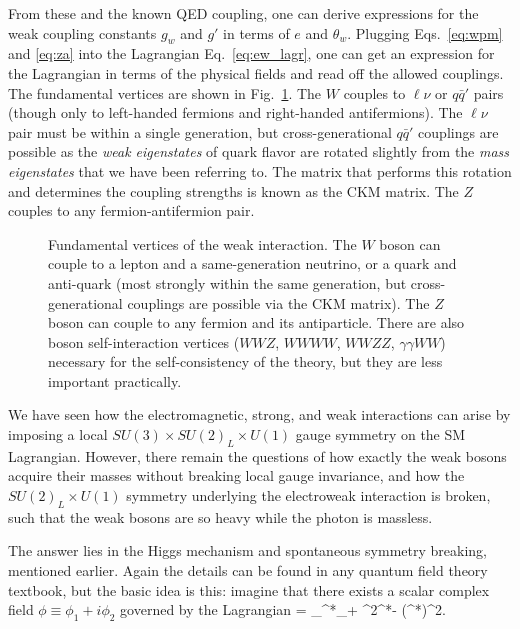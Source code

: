 From these and the known QED coupling, one can derive expressions for the weak coupling
constants $g_w$ and $g'$ in terms of $e$ and $\theta_w$. Plugging Eqs.~\ref{eq:wpm}
and \ref{eq:za} into the Lagrangian Eq.~\ref{eq:ew_lagr}, one can get an expression
for the Lagrangian in terms of the physical fields and read off the allowed couplings.
The fundamental vertices are shown in Fig.~\ref{fig:weak_diagrams}. The $W$ couples
to $\ell\nu$ or $q\bar{q}'$ pairs (though only to left-handed fermions
and right-handed antifermions). The $\ell\nu$ pair must be within a single generation,
but cross-generational $q\bar{q}'$ couplings are possible as the \textit{weak eigenstates}
of quark flavor are rotated slightly from the \textit{mass eigenstates} that we have been
referring to. The matrix that performs this rotation and determines the coupling strengths
is known as the CKM matrix.
The $Z$ couples to any fermion-antifermion pair.

\begin{figure}[t]
  \addtolength{\abovecaptionskip}{5mm}
  \centering
  \vskip5mm
  
  
  
    \caption{Fundamental vertices of the weak interaction. The $W$ boson can couple to a lepton
      and a same-generation neutrino, or a quark and anti-quark (most strongly within the same
      generation, but cross-generational couplings are possible via the CKM matrix).
      The $Z$ boson can couple to any fermion and its antiparticle. There are also
      boson self-interaction vertices ($WWZ$, $WWWW$, $WWZZ$, $\gamma\gamma WW$) necessary for the self-consistency 
      of the theory, but they are less important practically.
            }
    \label{fig:weak_diagrams}
\end{figure}

We have seen how the electromagnetic, strong, and weak interactions can arise by imposing
a local $SU(3)\times SU(2)_L\times U(1)$ gauge symmetry on the SM Lagrangian.
However, there remain the questions of how exactly the weak bosons acquire their masses without breaking
local gauge invariance, and how the $SU(2)_L\times U(1)$ symmetry underlying the electroweak
interaction is broken, such that the weak bosons are so heavy while the photon is massless.

The answer lies in the Higgs mechanism and spontaneous symmetry breaking, mentioned earlier.
Again the details can be found in any quantum field theory textbook, but the basic idea is this:
imagine that there exists a scalar complex field $\phi\equiv\phi_1+i\phi_2$ governed by the Lagrangian
\be
{} = \partial_\mu\phi^*\partial_\mu\phi + \mu^2\phi^*\phi - (\phi^*\phi)^2.
\ee

